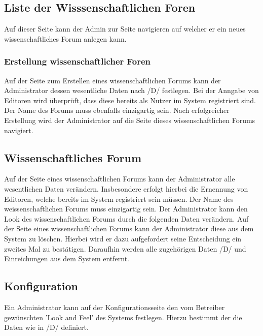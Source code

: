 \subsection{Liste der Wisssenschaftlichen Foren}
\begin{description}
    \XXitem{} Auf dieser Seite kann der Admin zur Seite navigieren auf welcher er ein neues
    wissenschaftliches Forum anlegen kann. %
\end{description}

\subsubsection{Erstellung wissenschaftlicher Foren}
\begin{description}
    \XXitem{} Auf der Seite zum Erstellen eines wissenschaftlichen Forums kann der Administrator dessen
    wesentliche Daten nach /D/ %
    festlegen. Bei der Anngabe von Editoren wird überprüft, dass diese bereits als Nutzer im System registriert sind.
    Der Name des Forums muss ebenfalls einzigartig sein.
    Nach erfolgreicher Erstellung wird der Administrator auf die Seite dieses wissenschaftlichen Forums
    navigiert.
\end{description}

\subsection{Wissenschaftliches Forum}
\begin{description}
    \XXitem{} Auf der Seite eines wissenschaftlichen Forums kann der Administrator alle wesentlichen Daten
    verändern. Insbesondere erfolgt hierbei die Ernennung von Editoren, welche bereits im System
    registriert sein  müssen. Der Name des weissenschaftlichen Forums muss einzigartig sein.
     Der Administrator kann den Look des wissenschaftlichen Forums durch die folgenden Daten
    verändern. %
    \XXitem{} Auf der Seite eines wissenschaftlichen Forums kann der Administrator diese aus dem System zu löschen.
    Hierbei wird er dazu aufgefordert seine Entscheidung ein zweites Mal zu bestätigen.
    Daraufhin werden alle zugehörigen Daten /D/ und Einreichungen aus dem System entfernt. %
\end{description}

\subsection{Konfiguration}
\begin{description}
    \XXitem{} Ein Administrator kann auf der Konfigurationsseite den vom Betreiber gewünschten
    'Look and Feel' des Systems festlegen. Hierzu bestimmt der die Daten wie in /D/ definiert. %
\end{description}
